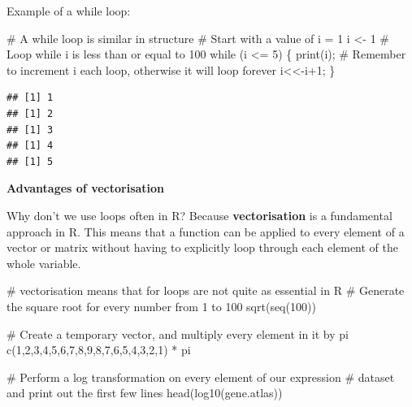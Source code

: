 \documentclass[a4paper]{book}
\newenvironment{Shaded}{}{}
\newcommand{\KeywordTok}[1]{\textcolor[rgb]{0.00,0.00,1.00}{{#1}}}
\newcommand{\DecValTok}[1]{{#1}}
\newcommand{\StringTok}[1]{\textcolor[rgb]{0.00,0.50,0.50}{{#1}}}
\newcommand{\CommentTok}[1]{\textcolor[rgb]{0.00,0.50,0.00}{{#1}}}
\newcommand{\NormalTok}[1]{{#1}}
\newlength{\leftbarwidth}
\newlength{\leftbarsep}
\newcommand*{\leftbarcolorcmd}{\color{darkgray}}%
\renewenvironment{leftbar}{%
    \def\FrameCommand{{\leftbarcolorcmd{\vrule width \leftbarwidth\relax\hspace {\leftbarsep}}}}%
    \MakeFramed {\advance \hsize -\width \FrameRestore }%
}{%
    \endMakeFramed
}
\renewenvironment{Shaded}
{\vspace{0em}\begin{leftbar}\begin{snugshade}}
{\end{snugshade}\end{leftbar}\vspace{0pt}}
\begin{document}
Example of a while loop:

\begin{Shaded}
\begin{Highlighting}[]
\CommentTok{# A while loop is similar in structure}
\CommentTok{# Start with a value of i = 1}
\NormalTok{i <-}\StringTok{ }\DecValTok{1}
\CommentTok{# Loop while i is less than or equal to 100}
\NormalTok{while (i <=}\StringTok{ }\DecValTok{5}\NormalTok{) \{}
  \KeywordTok{print}\NormalTok{(i);}
  \CommentTok{# Remember to increment i each loop, otherwise it will loop forever}
  \NormalTok{i<<-i}\DecValTok{+1}\NormalTok{;}
\NormalTok{\}}
\end{Highlighting}
\end{Shaded}

\begin{verbatim}
## [1] 1
## [1] 2
## [1] 3
## [1] 4
## [1] 5
\end{verbatim}

\textbf{Advantages of vectorisation}

Why don't we use loops often in R? Because \textbf{vectorisation} is a
fundamental approach in R. This means that a function can be applied to
every element of a vector or matrix without having to explicitly loop
through each element of the whole variable.

\begin{Shaded}
\begin{Highlighting}[]
\CommentTok{# vectorisation means that for loops are not quite as essential in R}
\CommentTok{# Generate the square root for every number from 1 to 100}
\KeywordTok{sqrt}\NormalTok{(}\KeywordTok{seq}\NormalTok{(}\DecValTok{100}\NormalTok{))}

\CommentTok{# Create a temporary vector, and multiply every element in it by pi}
\KeywordTok{c}\NormalTok{(}\DecValTok{1}\NormalTok{,}\DecValTok{2}\NormalTok{,}\DecValTok{3}\NormalTok{,}\DecValTok{4}\NormalTok{,}\DecValTok{5}\NormalTok{,}\DecValTok{6}\NormalTok{,}\DecValTok{7}\NormalTok{,}\DecValTok{8}\NormalTok{,}\DecValTok{9}\NormalTok{,}\DecValTok{8}\NormalTok{,}\DecValTok{7}\NormalTok{,}\DecValTok{6}\NormalTok{,}\DecValTok{5}\NormalTok{,}\DecValTok{4}\NormalTok{,}\DecValTok{3}\NormalTok{,}\DecValTok{2}\NormalTok{,}\DecValTok{1}\NormalTok{) *}\StringTok{ }\NormalTok{pi}

\CommentTok{# Perform a log transformation on every element of our expression}
\CommentTok{# dataset and print out the first few lines}
\KeywordTok{head}\NormalTok{(}\KeywordTok{log10}\NormalTok{(gene.atlas))}
\end{Highlighting}
\end{Shaded}
\end{document}
